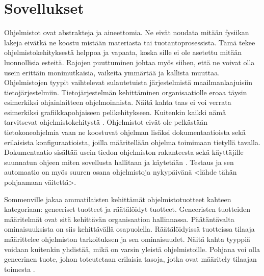\documentclass[utf8]{gradu3}
\begin{document}
\section{Sovellukset}
Ohjelmistot ovat abstrakteja ja aineettomia. Ne eivät noudata mitään fysiikan lakeja eivätkä ne koostu mistään materiasta tai tuotantoprosessista. Tämä tekee ohjelmistokehityksestä helppoa ja vapaata, koska sille ei ole asetettu mitään luonnollisia esteitä. Rajojen puuttuminen johtaa myös siihen, että ne voivat olla usein erittäin monimutkaisia, vaikeita ymmärtää ja kallista muuttaa. Ohjelmistojen tyypit vaihtelevat sulautetuista järjestelmistä maailmanlaajuisiin tietojärjestelmiin. Tietojärjestelmän kehittäminen organisaatiolle eroaa täysin esimerkiksi ohjainlaitteen ohjelmoinnista. Näitä kahta taas ei voi verrata esimerkiksi grafiikkapohjaiseen pelikehitykseen. Kuitenkin kaikki nämä tarvitsevat ohjelmistokehitystä \parencite[s.1-10]{Sommerville}. Ohjelmistot eivät ole pelkästään tietokoneohjelmia vaan ne koostuvat ohjelman lisäksi dokumentaatioista sekä erilaisista konfiguraatioista, joilla määritellään ohjelma toimimaan tietyllä tavalla. Dokumentaatio sisältää usein tiedon ohjelmiston rakanteesta sekä käyttäjille suunnatun ohjeen miten sovellusta hallitaan ja käytetään \parencite[s.1-10]{Sommerville}. Testaus ja sen automaatio on myös suuren osana ohjelmistoja nykypäivänä <lähde tähän pohjaamaan väitettä>. 

Sommenville jakaa ammatilaisten kehittämät ohjelmistotuotteet kahteen kategoriaan: geneeriset tuotteet ja räätälöidyt tuotteet. Geneeristen tuotteiden määritelmät ovat sitä kehittävän organisaation hallinnassa. Päätäntävalta ominaisuuksista on siis kehittävällä osapuolella. Räätälöidyissä tuotteissa tilaaja määrittelee ohjelmiston tarkoituksen ja sen ominaisuudet. Näitä kahta tyyppiä voidaan kuitenkin yhdistää, mikä on varsin yleistä ohjelmistoille. Pohjana voi olla geneerinen tuote, johon toteutetaan erilaisia tasoja, jotka ovat määritely tilaajan toimesta \parencite[s.1-10]{Sommerville}.
\end{document}
